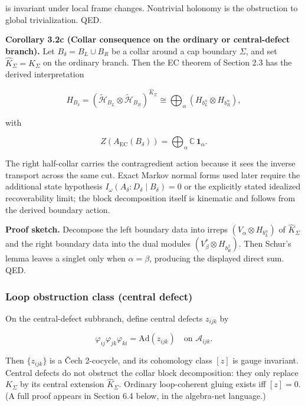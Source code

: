is invariant under local frame changes. Nontrivial holonomy is the obstruction to global trivialization. QED.

\textbf{Corollary 3.2c (Collar consequence on the ordinary or central-defect branch).} Let \(B_\delta = B_L \cup B_R\) be a collar around a cap boundary \(\Sigma\), and set \(\widehat K_\Sigma = K_\Sigma\) on the ordinary branch. Then the EC theorem of Section 2.3 has the derived interpretation

\[
H_{B_\delta}
=
(\tilde{\mathcal H}_{B_L}\otimes \tilde{\mathcal H}_{B_R})^{\widehat K_\Sigma}
\cong
\bigoplus_\alpha
(H_{b_L^\alpha}\otimes H_{b_R^\alpha}),
\]

with

\[
Z(A_{\mathrm{EC}}(B_\delta)) = \bigoplus_\alpha \mathbb C\,\mathbf 1_\alpha.
\]

The right half-collar carries the contragredient action because it sees the inverse transport across the same cut. Exact Markov normal forms used later require the additional state hypothesis \(I_\omega(A_\delta:D_\delta \mid B_\delta)=0\) or the explicitly stated idealized recoverability limit; the block decomposition itself is kinematic and follows from the derived boundary action.

\textbf{Proof sketch.} Decompose the left boundary data into irreps \((V_\alpha \otimes H_{b_L^\alpha})\) of \(\widehat K_\Sigma\) and the right boundary data into the dual modules \((V_\beta^* \otimes H_{b_R^\beta})\). Then Schur's lemma leaves a singlet only when \(\alpha=\beta\), producing the displayed direct sum. QED.

\subsubsection{Loop obstruction class (central defect)}\label{33-loop-obstruction-class-central-defect}

On the central-defect subbranch, define central defects \(z_{ijk}\) by

\[
\varphi_{ij} \varphi_{jk} \varphi_{ki} = \mathrm{Ad}(z_{ijk}) \quad \text{on } \mathcal{A}_{ijk}.
\]

Then \(\{z_{ijk}\}\) is a \v{C}ech 2-cocycle, and its cohomology class \([z]\) is gauge invariant. Central defects do not obstruct the collar block decomposition: they only replace \(K_\Sigma\) by its central extension \(\widehat K_\Sigma\). Ordinary loop-coherent gluing exists iff \([z] = 0\). (A full proof appears in Section 6.4 below, in the algebra-net language.)

